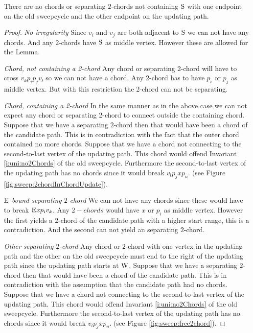  \begin{lemma}
    \label{lm:sweep:noConnectingIregularity}
    There are no chords or separating $2$-chords not containing $\mathrm{S}$ with one endpoint on the old sweepcycle and the other endpoint on the updating path.
  \end{lemma}

  \begin{proof}
    \emph{No irregularity}
    Since $v_i$ and $v_j$ are both adjacent to $\mathrm{S}$ we can not have any chords. And any $2$-chords have $\mathrm{S}$ as middle vertex. However these are allowed for the Lemma.

    \emph{Chord, not containing a 2-chord}
    Any chord or separating $2$-chord will have to cross $v_k p_i p_j v_l$ so we can not have a chord. Any 2-chord has to have $p_i$ or $p_j$ as middle vertex. But with this restriction the 2-chord can not be separating.

    \emph{Chord, containing a 2-chord}
    In the same manner as in the above case we can not expect any chord or separating 2-chord to connect outside the containing chord.
    Suppose that we have a separating $2$-chord then that would have been a chord of the candidate path. This is in contradiction with the fact that the outer chord contained no more chords.
    Suppose that we have a chord not connecting to the second-to-last vertex of the updating path. This chord would offend Invariant \ref{i:uni:no2Chords} of the old sweepcycle. Furthermore the second-to-last vertex of the updating path has no chords since it would break $v_l p_j x p_u$. (see Figure \ref{fig:sweep:2chordInChordUpdate}).

    \emph{$\mathrm{E}$-bound separating $2$-chord}
    We can not have any chords since these would have to break $\mathrm{E} x p_i v_k$. Any $2-chords$ would have $x$ or $p_i$ as middle vertex. However the first yields a $2$-chord of the candidate path with a higher start range, this is a contradiction. And the second can not yield an separating $2$-chord.


    \emph{Other separating $2$-chord}
    Any chord or $2$-chord with one vertex in the updating path and the other on the old sweepcycle must end to the right of the updating path since the updating path starts at $\mathrm{W}$.
    Suppose that we have a separating $2$-chord then that would have been a chord of the candidate path. This is in contradiction with the assumption that the candidate path had no chords.
    Suppose that we have a chord not connecting to the second-to-last vertex of the updating path. This chord would offend Invariant \ref{i:uni:no2Chords} of the old sweepcycle. Furthermore the second-to-last vertex of the updating path has no chords since it would break $v_l p_j x p_u$. (see Figure \ref{fig:sweep:free2chord}).
  \end{proof}


